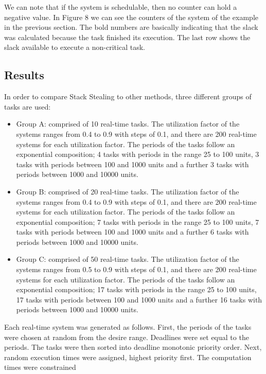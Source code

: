 \documentclass[conference]{IEEEtran}
\begin{document}
We can note that if the system is schedulable, then no counter can hold a negative value.
In Figure 8 we can see the counters of the system of the example in the previous section. The bold numbers are basically indicating
that the slack was calculated because the task finished its execution. The last row shows the slack available to execute a
non-critical task. 

\subsection{Results}

In order to compare Stack Stealing to other methods, three different
groups of tasks are used:
\begin{itemize}
	\item Group A: comprised of 10 real-time tasks. The utilization factor of the systems ranges from 0.4 to 0.9 with
	steps of 0.1, and there are 200 real-time systems for each utilization factor. The periods of the tasks follow
	an exponential composition; 4 tasks with periods in the range 25 to 100 units, 3 tasks with periods between
	100 and 1000 units and a further 3 tasks with periods between 1000 and 10000 units.
	\item Group B: comprised of 20 real-time tasks. The utilization factor of the systems ranges from 0.4 to 0.9 with
	steps of 0.1, and there are 200 real-time systems for each utilization factor. The periods of the tasks follow
	an exponential composition; 7 tasks with periods in the range 25 to 100 units, 7 tasks with periods between
	100 and 1000 units and a further 6 tasks with periods between 1000 and 10000 units.
	\item Group C: comprised of 50 real-time tasks. The utilization factor of the systems ranges from 0.5 to 0.9 with
	steps of 0.1, and there are 200 real-time systems for each utilization factor. The periods of the tasks follow
	an exponential composition; 17 tasks with periods in the range 25 to 100 units, 17 tasks with periods
	between 100 and 1000 units and a further 16 tasks with periods between 1000 and 10000 units.
	
\end{itemize}
Each real-time system was generated as follows. First, the periods of the tasks were chosen at random from the
desire range. Deadlines were set equal to the periods. The tasks were then sorted into deadline monotonic priority order. Next, random execution times were assigned, highest priority first. The computation times were constrained
\end{document}
